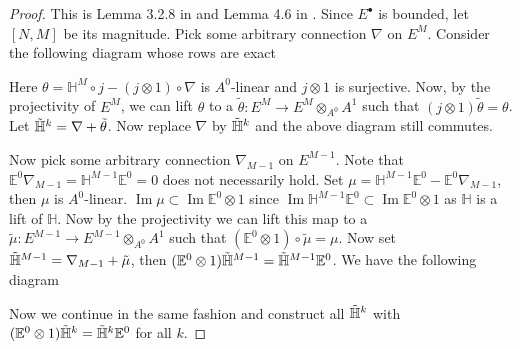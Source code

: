 \documentclass[12pt]{amsart}
\theoremstyle{definition}
\theoremstyle{remark}
\numberwithin{equation}{section}
\newcommand{\A}{{A}}
\newcommand{\1}{{\mathbb{1}}}
\newcommand{\bt}{\bullet}
\newcommand{\im}{\operatorname{Im}}
\begin{document}
\begin{proof}
This is Lemma 3.2.8 in \cite{Blo05} and Lemma 4.6 in \cite{BS14}. Since $E^{\bt}$ is bounded, let $[N, M]$ be its magnitude. Pick some arbitrary connection $\nabla$ on $E^M$. Consider the following diagram whose rows are exact

\begin{center}
\end{center}
Here $\theta = \mathbb{H}^M \circ j - (j\otimes 1)\circ \nabla$ is $\A^0$-linear and $j\otimes 1$ is surjective. Now, by the projectivity of $E^M$, we can lift $\theta$ to a $\tilde{\theta}: E^M \to E^M \otimes_{\A^0} \A^{1}$ such that $(j\otimes 1)\tilde{\theta} = \theta$. Let $\Tilde{\mathbb{H}}^k = \nabla + \Tilde{\theta}$. Now replace $\nabla$ by $\Tilde{\mathbb{H}}^k$ and the above diagram still commutes.

Now pick some arbitrary connection $\nabla_{M-1}$ on $E^{M-1}$. Note that $\mathbb{E}^0\nabla_{M-1} = {\mathbb{H}}^{M-1}\mathbb{E}^0 = 0$ does not necessarily hold. Set $\mu = {\mathbb{H}}^{M-1}\mathbb{E}^0  - \mathbb{E}^0\nabla_{M-1}$, then $\mu$ is $\A^0$-linear. $\im \mu \subset \im \mathbb{E}^0 \otimes 1$ since $\im {\mathbb{H}}^{M-1}\mathbb{E}^0 \subset  \im \mathbb{E}^0 \otimes 1$ as ${\mathbb{H}}$ is a lift of $\mathbb{H}$. Now by the projectivity we can lift this map to a $\tilde{\mu}: E^{M-1} \to E^{M-1} \otimes_{\A^0} \A^{1}$ such that $(\mathbb{E}^0 \otimes 1)\circ \tilde{\mu} = \mu$. Now set $\Tilde{\mathbb{H}}^{M-1} = \nabla_{M-1} + \Tilde{\mu}$, then $(\mathbb{E}^0\otimes 1)\Tilde{\mathbb{H}}^{M-1} = \Tilde{\mathbb{H}}^{M-1}\mathbb{E}^0$. We have the following diagram
\begin{center}
\end{center}
Now we continue in the same fashion and construct all $\Tilde{\mathbb{H}}^{k}$ with $(\mathbb{E}^0\otimes 1)\Tilde{\mathbb{H}}^{k} = \Tilde{\mathbb{H}}^{k}\mathbb{E}^0$ for all $k$.
\end{proof}
\end{document}
